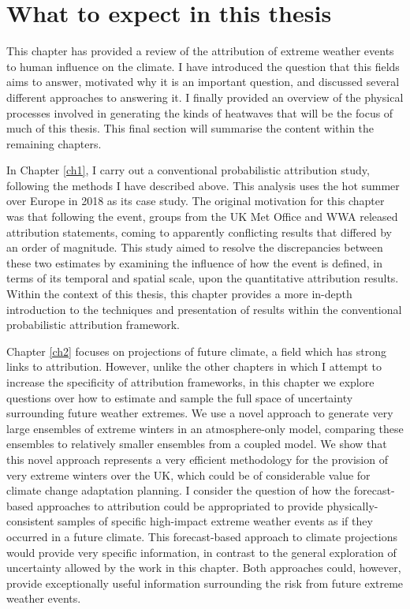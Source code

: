 \section{What to expect in this thesis}

  This chapter has provided a review of the attribution of extreme weather events to human influence on the climate. I have introduced the question that this fields aims to answer, motivated why it is an important question, and discussed several different approaches to answering it. I finally provided an overview of the physical processes involved in generating the kinds of heatwaves that will be the focus of much of this thesis. This final section will summarise the content within the remaining chapters.

  In Chapter \ref{ch1}, I carry out a conventional probabilistic attribution study, following the methods I have described above. This analysis uses the hot summer over Europe in 2018 as its case study. The original motivation for this chapter was that following the event, groups from the UK Met Office and WWA released attribution statements, coming to apparently conflicting results that differed by an order of magnitude. This study aimed to resolve the discrepancies between these two estimates by examining the influence of how the event is defined, in terms of its temporal and spatial scale, upon the quantitative attribution results. Within the context of this thesis, this chapter provides a more in-depth introduction to the techniques and presentation of results within the conventional probabilistic attribution framework.

  Chapter \ref{ch2} focuses on projections of future climate, a field which has strong links to attribution. However, unlike the other chapters in which I attempt to increase the specificity of attribution frameworks, in this chapter we explore questions over how to estimate and sample the full space of uncertainty surrounding future weather extremes. We use a novel approach to generate very large ensembles of extreme winters in an atmosphere-only model, comparing these ensembles to relatively smaller ensembles from a coupled model. We show that this novel approach represents a very efficient methodology for the provision of very extreme winters over the UK, which could be of considerable value for climate change adaptation planning. I consider the question of how the forecast-based approaches to attribution could be appropriated to provide physically-consistent samples of specific high-impact extreme weather events as if they occurred in a future climate. This forecast-based approach to climate projections would provide very specific information, in contrast to the general exploration of uncertainty allowed by the work in this chapter. Both approaches could, however, provide exceptionally useful information surrounding the risk from future extreme weather events.

